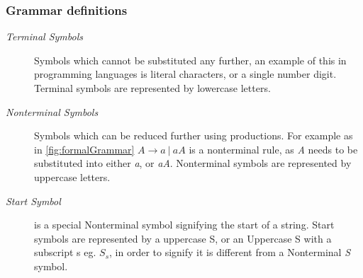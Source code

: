 \subsubsection{Grammar definitions}
\begin{description}
    \item[\textit{Terminal Symbols}] Symbols which cannot be substituted any further, an example of this in programming languages is literal characters, or a single number digit. Terminal symbols are represented by lowercase letters.
    
    \item[\textit{Nonterminal Symbols}] Symbols which can be reduced further using productions. For example as in \ref{fig:formalGrammar} $A \rightarrow a\ |\ aA$ is a nonterminal rule, as \textit{A} needs to be substituted into either \textit{a}, or \textit{aA}. Nonterminal symbols are represented by uppercase letters.

    \item[\textit{Start Symbol}] is a special Nonterminal symbol signifying the start of a string. Start symbols are represented by a uppercase S, or an Uppercase S with a subscript s eg. $S_s$, in order to signify it is different from a Nonterminal \textit{S} symbol.
\end{description}

